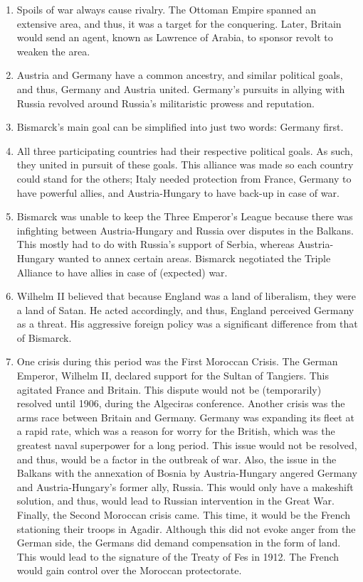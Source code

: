 \documentclass[12pt]{article}
\begin{document}
\begin{enumerate}
\item Spoils of war always cause rivalry. The Ottoman Empire spanned an extensive area, and thus, it was a target for the conquering. Later, Britain would send an agent, known as Lawrence of Arabia, to sponsor revolt to weaken the area.

\item Austria and Germany have a common ancestry, and similar political goals, and thus, Germany and Austria united. Germany's pursuits in allying with Russia revolved around Russia's militaristic prowess and reputation.

\item Bismarck's main goal can be simplified into just two words: Germany first.

\item All three participating countries had their respective political goals. As such, they united in pursuit of these goals. This alliance was made so each country could stand for the others; Italy needed protection from France, Germany to have powerful allies, and Austria-Hungary to have back-up in case of war.

\item Bismarck was unable to keep the Three Emperor's League because there was infighting between Austria-Hungary and Russia over disputes in the Balkans. This mostly had to do with Russia's support of Serbia, whereas Austria-Hungary wanted to annex certain areas. Bismarck negotiated the Triple Alliance to have allies in case of (expected) war.

\item Wilhelm II believed that because England was a land of liberalism, they were a land of Satan. He acted accordingly, and thus, England perceived Germany as a threat. His aggressive foreign policy was a significant difference from that of Bismarck.

\item One crisis during this period was the First Moroccan Crisis. The German Emperor, Wilhelm II, declared support for the Sultan of Tangiers. This agitated France and Britain. This dispute would not be (temporarily) resolved until 1906, during the Algeciras conference. Another crisis was the arms race between Britain and Germany. Germany was expanding its fleet at a rapid rate, which was a reason for worry for the British, which was the greatest naval superpower for a long period. This issue would not be resolved, and thus, would be a factor in the outbreak of war. Also, the issue in the Balkans with the annexation of Bosnia by Austria-Hungary angered Germany and Austria-Hungary's former ally, Russia. This would only have a makeshift solution, and thus, would lead to Russian intervention in the Great War. Finally, the Second Moroccan crisis came. This time, it would be the French stationing their troops in Agadir. Although this did not evoke anger from the German side, the Germans did demand compensation in the form of land. This would lead to the signature of the Treaty of Fes in 1912. The French would gain control over the Moroccan protectorate.


\end{enumerate}
\end{document}
